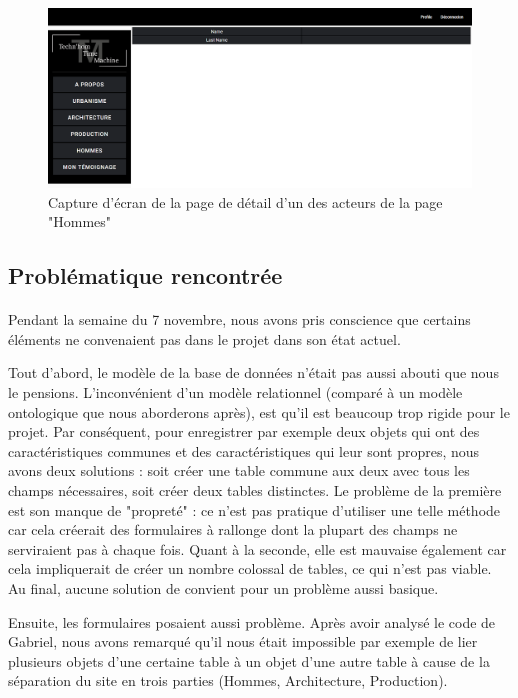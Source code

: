 \begin{figure} [H]
    \centering
    \includegraphics[width=1\textwidth]{assets/web/site/screen_detail_hommes.png}
    \caption{Capture d'écran de la page de détail d'un des acteurs de la page "Hommes"}
    \label{fig:screenPageHommesDetails}
\end{figure}

\pagebreak
\subsection{Problématique rencontrée}

\paragraph{} \hspace{10mm}
Pendant la semaine du 7 novembre, nous avons pris conscience que certains éléments ne convenaient pas dans le projet dans son état actuel. 

Tout d'abord, le modèle de la base de données n'était pas aussi abouti que nous le pensions. L'inconvénient d'un modèle relationnel (comparé à un modèle ontologique que nous aborderons après), est qu'il est beaucoup trop rigide pour le projet. Par conséquent, pour enregistrer par exemple deux objets qui ont des caractéristiques communes et des caractéristiques qui leur sont propres, nous avons deux solutions : soit créer une table commune aux deux avec tous les champs nécessaires, soit créer deux tables distinctes. Le problème de la première est son manque de "propreté" : ce n'est pas pratique d'utiliser une telle méthode car cela créerait des formulaires à rallonge dont la plupart des champs ne serviraient pas à chaque fois. Quant à la seconde, elle est mauvaise également car cela impliquerait de créer un nombre colossal de tables, ce qui n'est pas viable. Au final, aucune solution de convient pour un problème aussi basique.

Ensuite, les formulaires posaient aussi problème. Après avoir analysé le code de Gabriel, nous avons remarqué qu'il nous était impossible par exemple de lier plusieurs objets d'une certaine table à un objet d'une autre table à cause de la séparation du site en trois parties (Hommes, Architecture, Production).

